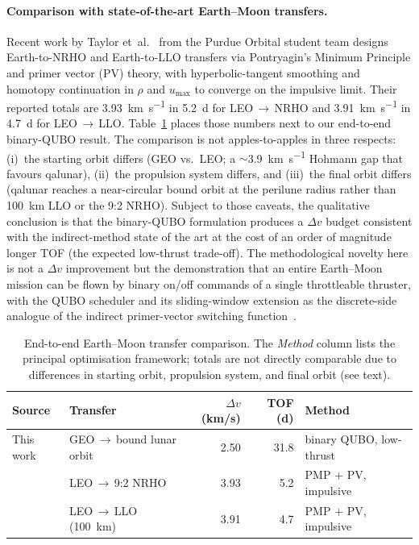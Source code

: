 \documentclass[11pt,a4paper]{article}
\theoremstyle{plain}
\begin{document}
\paragraph{Comparison with state-of-the-art Earth--Moon
transfers.} Recent work by Taylor et~al.~\cite{Taylor2026} from
the Purdue Orbital student team designs Earth-to-NRHO and
Earth-to-LLO transfers via Pontryagin's Minimum Principle and
primer vector (PV) theory, with hyperbolic-tangent smoothing and
homotopy continuation in $\rho$ and $u_\mathrm{max}$ to converge
on the impulsive limit. Their reported totals are
\SI{3.93}{\km\per\second} in \SI{5.2}{\day} for LEO\,$\to$\,NRHO
and \SI{3.91}{\km\per\second} in \SI{4.7}{\day} for
LEO\,$\to$\,LLO. Table~\ref{tab:purdue-comparison} places those
numbers next to our end-to-end binary-QUBO result. The comparison
is not apples-to-apples in three respects: (i)~the starting orbit
differs (GEO vs.\ LEO; a $\sim$\SI{3.9}{\km\per\second} Hohmann
gap that favours qalunar), (ii)~the propulsion system differs, and (iii)~the final
orbit differs (qalunar reaches a near-circular bound orbit at the
perilune radius rather than \SI{100}{\km} LLO or the 9{:}2 NRHO).
Subject to those caveats, the qualitative conclusion is that the
binary-QUBO formulation produces a $\Delta v$ budget consistent
with the indirect-method state of the art at the cost of an order
of magnitude longer TOF (the expected low-thrust trade-off). The
methodological novelty here is not a $\Delta v$ improvement but
the demonstration that an entire Earth--Moon mission can be flown
by binary on/off commands of a single throttleable thruster, with
the QUBO scheduler and its sliding-window extension as the
discrete-side analogue of the indirect primer-vector switching
function~\cite{Taylor2026}.

\begin{table}[htbp]
\centering
\caption{End-to-end Earth--Moon transfer comparison. The
\emph{Method} column lists the principal optimisation framework;
totals are not directly comparable due to differences in starting
orbit, propulsion system, and final orbit (see text).}
\label{tab:purdue-comparison}
\begin{tabular}{llrrl}
\toprule
Source & Transfer & $\Delta v$ (km/s) & TOF (d) & Method \\
\midrule
This work
  & GEO\,$\to$\,bound lunar orbit
  & \num{2.50} & \num{31.8}
  & binary QUBO, low-thrust \\
\cite{Taylor2026}
  & LEO\,$\to$\,9{:}2 NRHO
  & \num{3.93} & \num{5.2}
  & PMP + PV, impulsive \\
\cite{Taylor2026}
  & LEO\,$\to$\,LLO (\SI{100}{\km})
  & \num{3.91} & \num{4.7}
  & PMP + PV, impulsive \\
\bottomrule
\end{tabular}
\end{table}
\end{document}
